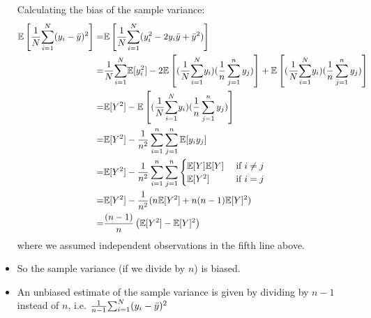 \begin{frame}[allowframebreaks]
\begin{itemize}
Calculating the bias of the sample variance:
\begin{align*}
  \mathbb{E}\left[\frac{1}{N} \underset{i=1}{\overset{N}{\sum}} (y_i - \bar{y})^2\right] = &  \mathbb{E}\left[ \frac{1}{N} \underset{i=1}{\overset{N}{\sum}} (y_i^2 -
                                             2 y_i \bar{y} +
                                             \bar{y}^2) \right] \\
  = & \frac{1}{N} \underset{i=1}{\overset{N}{\sum}} \mathbb{E}[y_i^2] - 2\mathbb{E}\left[ (\frac{1}{N} \underset{i=1}{\overset{N}{\sum}} y_i )(\frac{1}{n} \sum_{j=1}^n
      y_j) \right] + \mathbb{E}\left[ (\frac{1}{N} \underset{i=1}{\overset{N}{\sum}} y_i )(\frac{1}{n} \sum_{j=1}^n
      y_j) \right] \\ 
  = & \mathbb{E}[Y^2] - \mathbb{E}\left[ (\frac{1}{N} \underset{i=1}{\overset{N}{\sum}} y_i )(\frac{1}{n} \sum_{j=1}^n
      y_j) \right] \\
  = & \mathbb{E}[Y^2 ] - \frac{1}{n^2} \sum_{i=1}^n \sum_{j=1}^n \mathbb{E}[y_i y_j]
  \\
  = & \mathbb{E}[Y^2] - \frac{1}{n^2} \sum_{i=1}^n \sum_{j=1}^n \begin{cases}
    \mathbb{E}[Y] \mathbb{E}[Y] & \text{ if } i \neq j \\
    \mathbb{E}[Y^2] & \text{ if } i = j 
  \end{cases} \\
  = & \mathbb{E}[Y^2] - \frac{1}{n^2} (n \mathbb{E}[Y^2] + n(n-1) \mathbb{E}[Y]^2) \\
  = & \frac{(n-1)}{n} \left(\mathbb{E}[Y^2] - \mathbb{E}[Y]^2 \right)
\end{align*}
where we assumed independent observations in the fifth line above. 
\item So the sample variance (if we divide by $n$) is biased. 
\item An unbiased
estimate of the sample variance is given by dividing by $n-1$ instead
of $n$, i.e. $\frac{1}{n-1} {\sum_{i=1}^N} (y_i - \bar{y})^2$
 \end{itemize}  
\end{frame}
